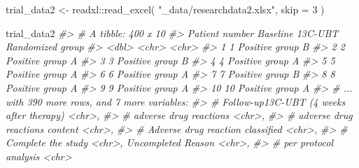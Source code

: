 \documentclass[
]{book}
\newenvironment{Shaded}{\begin{snugshade}}{\end{snugshade}}
\newcommand{\AttributeTok}[1]{\textcolor[rgb]{0.77,0.63,0.00}{#1}}
\newcommand{\CommentTok}[1]{\textcolor[rgb]{0.56,0.35,0.01}{\textit{#1}}}
\newcommand{\DecValTok}[1]{\textcolor[rgb]{0.00,0.00,0.81}{#1}}
\newcommand{\FunctionTok}[1]{\textcolor[rgb]{0.00,0.00,0.00}{#1}}
\newcommand{\NormalTok}[1]{#1}
\newcommand{\OtherTok}[1]{\textcolor[rgb]{0.56,0.35,0.01}{#1}}
\newcommand{\SpecialCharTok}[1]{\textcolor[rgb]{0.00,0.00,0.00}{#1}}
\newcommand{\StringTok}[1]{\textcolor[rgb]{0.31,0.60,0.02}{#1}}
\begin{document}
\begin{Shaded}
\begin{Highlighting}[]
\NormalTok{trial\_data2 }\OtherTok{\textless{}{-}}\NormalTok{ readxl}\SpecialCharTok{::}\FunctionTok{read\_excel}\NormalTok{(}
  \StringTok{"\_data/researchdata2.xlsx"}\NormalTok{,}
  \AttributeTok{skip =} \DecValTok{3}
\NormalTok{  )}

\NormalTok{trial\_data2}
\CommentTok{\#\textgreater{} \# A tibble: 400 x 10}
\CommentTok{\#\textgreater{}    \textasciigrave{}Patient number\textasciigrave{} \textasciigrave{}Baseline 13C{-}UBT\textasciigrave{} \textasciigrave{}Randomized group\textasciigrave{}}
\CommentTok{\#\textgreater{}               \textless{}dbl\textgreater{} \textless{}chr\textgreater{}              \textless{}chr\textgreater{}             }
\CommentTok{\#\textgreater{}  1                1 Positive           group B           }
\CommentTok{\#\textgreater{}  2                2 Positive           group A           }
\CommentTok{\#\textgreater{}  3                3 Positive           group B           }
\CommentTok{\#\textgreater{}  4                4 Positive           group A           }
\CommentTok{\#\textgreater{}  5                5 Positive           group A           }
\CommentTok{\#\textgreater{}  6                6 Positive           group A           }
\CommentTok{\#\textgreater{}  7                7 Positive           group B           }
\CommentTok{\#\textgreater{}  8                8 Positive           group A           }
\CommentTok{\#\textgreater{}  9                9 Positive           group A           }
\CommentTok{\#\textgreater{} 10               10 Positive           group A           }
\CommentTok{\#\textgreater{} \# ... with 390 more rows, and 7 more variables:}
\CommentTok{\#\textgreater{} \#   \textasciigrave{}Follow{-}up13C{-}UBT (4 weeks after therapy)\textasciigrave{} \textless{}chr\textgreater{},}
\CommentTok{\#\textgreater{} \#   \textasciigrave{}adverse drug reactions\textasciigrave{} \textless{}chr\textgreater{},}
\CommentTok{\#\textgreater{} \#   \textasciigrave{}adverse drug reactions  content\textasciigrave{} \textless{}chr\textgreater{},}
\CommentTok{\#\textgreater{} \#   \textasciigrave{}Adverse drug reaction classified\textasciigrave{} \textless{}chr\textgreater{},}
\CommentTok{\#\textgreater{} \#   \textasciigrave{}Complete the study\textasciigrave{} \textless{}chr\textgreater{}, \textasciigrave{}Uncompleted Reason\textasciigrave{} \textless{}chr\textgreater{},}
\CommentTok{\#\textgreater{} \#   \textasciigrave{}per protocol analysis\textasciigrave{} \textless{}chr\textgreater{}}
\end{Highlighting}
\end{Shaded}
\end{document}
